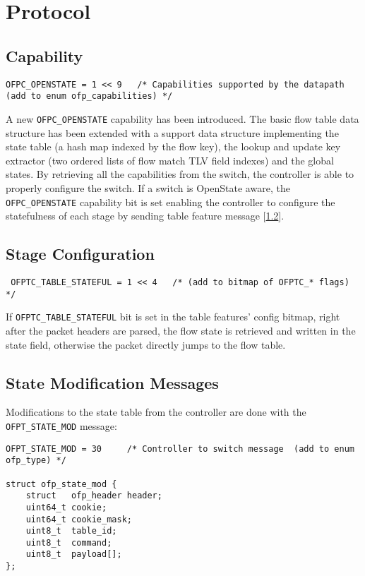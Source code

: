 
\chapter{Protocol}
\label{chap:protocol}

\section{Capability}
\label{sec:capability}
\scriptsize
\begin{verbatim}
OFPC_OPENSTATE = 1 << 9   /* Capabilities supported by the datapath (add to enum ofp_capabilities) */
\end{verbatim}
\normalsize
\noindent
A new \texttt{OFPC\_OPENSTATE} capability has been introduced.
The basic flow table data structure has been extended with a support data structure implementing the state table (a hash map indexed by the flow key), the lookup and update key extractor (two ordered lists of flow match TLV field indexes) and the global states.
By retrieving all the capabilities from the switch, the controller is able to properly configure the switch. If a switch is OpenState aware, the \texttt{OFPC\_OPENSTATE} capability bit is set enabling the controller to configure the statefulness of each stage by sending table feature message [\ref{sec:table_conf}].

\section{Stage Configuration}
\label{sec:table_conf}
\scriptsize
\begin{verbatim}
 OFPTC_TABLE_STATEFUL = 1 << 4   /* (add to bitmap of OFPTC_* flags) */
\end{verbatim}
\normalsize
If \texttt{OFPTC\_TABLE\_STATEFUL} bit is set in the table features' config bitmap, right after the packet headers are parsed, the flow state is retrieved and written in the state field, otherwise the packet directly jumps to the flow table. 

\section{State Modification Messages}

\label{sec:msg_set_state_proto}

Modifications to the state table from the controller are done with the \texttt{OFPT\_STATE\_MOD} message:
\scriptsize
\begin{verbatim}
OFPT_STATE_MOD = 30     /* Controller to switch message  (add to enum ofp_type) */

struct ofp_state_mod {
    struct   ofp_header header;
    uint64_t cookie;
    uint64_t cookie_mask;
    uint8_t  table_id;
    uint8_t  command;
    uint8_t  payload[];
};
\end{verbatim}
\normalsize

